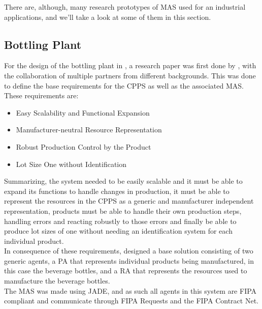 There are, although, many research prototypes of \acrshort{MAS} used for an industrial applications, and we'll take a look at some of them in this section.

\subsection{Bottling Plant}
\label{subsec:bottling_plant}

For the design of the bottling plant in \cite{bottling_plant_part2}, a research paper \cite{bottling_plant_part1} was first done by \citeauthor{bottling_plant_part1}, with the collaboration of multiple partners from different backgrounds. This was done to define the base requirements for the \acrshort{CPPS} as well as the associated \acrshort{MAS}. These requirements are:

\begin{itemize}
	\item Easy Scalability and Functional Expansion
	\item Manufacturer-neutral Resource Representation
	\item Robust Production Control by the Product
	\item Lot Size One without Identification
\end{itemize}

Summarizing, the system needed to be easily scalable and it must be able to expand its functions to handle changes in production, it must be able to represent the resources in the \acrshort{CPPS} as a generic and manufacturer independent representation, products must be able to handle their own production steps, handling errors and reacting robustly to those errors and finally be able to produce lot sizes of one without needing an identification system for each individual product.\\

In consequence of these requirements, \citeauthor{bottling_plant_part1} designed a base solution consisting of two generic agents, a \acrfull{PA} that represents individual products being manufactured, in this case the beverage bottles, and a \acrfull{RA} that represents the resources used to manufacture the beverage bottles.\\

The \acrshort{MAS} was made using \acrshort{JADE}, and as such all agents in this system are \acrshort{FIPA} compliant and communicate through \acrshort{FIPA} Requests and the \acrshort{FIPA} Contract Net.\\

